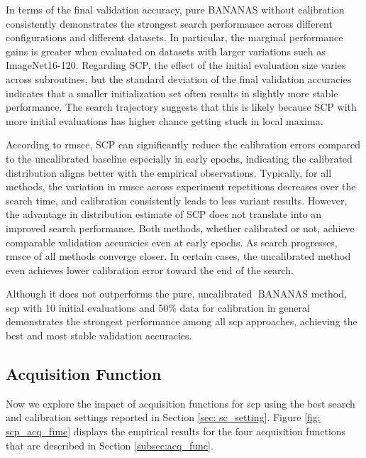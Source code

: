\documentclass[a4paper,oneside,bibliography=totoc]{scrbook}
\begin{document}
In terms of the final validation accuracy, pure BANANAS without calibration consistently demonstrates the strongest search performance across different configurations and different datasets. In particular, the marginal performance gains is greater when evaluated on datasets with larger variations such as ImageNet16-120. Regarding  SCP, the effect of the initial evaluation size varies across subroutines, but the standard deviation of the final validation accuracies indicates that a smaller initialization set often results in slightly more stable performance. The search trajectory suggests that this is likely because SCP with more initial evaluations has higher chance getting stuck in local maxima. 

According to \gls{rmsce}, SCP can significantly reduce the calibration errors compared to the uncalibrated baseline especially in early epochs, indicating the calibrated distribution aligns better with the empirical observations. Typically, for all methods, the variation in \gls{rmsce} across experiment repetitions decreases over the search time, and calibration consistently leads to less variant results. However, the advantage in distribution estimate of SCP does not translate into an improved search performance. Both methods, whether calibrated or not, achieve comparable validation accuracies even at early epochs.  As search progresses, \gls{rmsce} of all methods converge closer.  In certain cases, the uncalibrated method even achieves lower calibration error toward the end of the search.

Although it does not outperforms the pure, uncalibrated BANANAS method, \gls{scp} with 10 initial evaluations and 50\% data for calibration in general demonstrates the strongest performance among all \gls{scp} approaches, achieving the best and most stable validation accuracies.

\subsection{Acquisition Function}
Now we explore the impact of acquisition functions for \gls{scp} using the best search and calibration settings reported in Section \ref{sec: sc_setting}. Figure \ref{fig: scp_acq_func} displays the empirical results for the four acquisition functions that are described in Section \ref{subsec:acq_func}. 

\vspace{0.5em}
\end{document}
